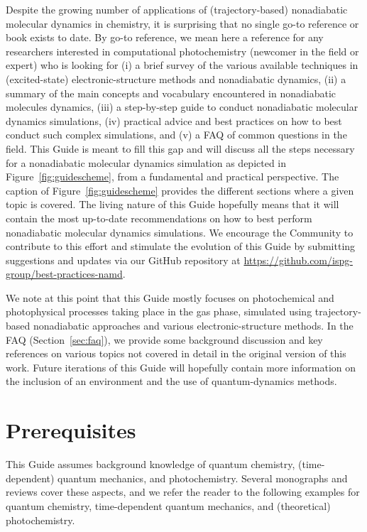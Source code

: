 \documentclass[9pt,bestpractices,pubversion]{livecoms}
\newcommand{\githubrepository}{\url{https://github.com/ispg-group/best-practices-namd}}  %
\begin{document}
Despite the growing number of applications of (trajectory-based) nonadiabatic molecular dynamics in chemistry, it is surprising that no single go-to reference or book exists to date. By go-to reference, we mean here a reference for any researchers interested in computational photochemistry (newcomer in the field or expert) who is looking for (i) a brief survey of the various available techniques in (excited-state) electronic-structure methods and nonadiabatic dynamics, (ii) a summary of the main concepts and vocabulary encountered in nonadiabatic molecules dynamics, (iii) a step-by-step guide to conduct nonadiabatic molecular dynamics simulations, (iv) practical advice and best practices on how to best conduct such complex simulations, and (v) a FAQ of common questions in the field. This Guide is meant to fill this gap and will discuss all the steps necessary for a nonadiabatic molecular dynamics simulation as depicted in Figure~\ref{fig:guidescheme}, from a fundamental and practical perspective. The caption of Figure~\ref{fig:guidescheme} provides the different sections where a given topic is covered. The living nature of this Guide hopefully means that it will contain the most up-to-date recommendations on how to best perform nonadiabatic molecular dynamics simulations. We encourage the Community to contribute to this effort and stimulate the evolution of this Guide by submitting suggestions and updates via our GitHub repository at \githubrepository.

We note at this point that this Guide mostly focuses on photochemical and photophysical processes taking place in the gas phase, simulated using trajectory-based nonadiabatic approaches and various electronic-structure methods. In the FAQ (Section~\ref{sec:faq}), we provide some background discussion and key references on various topics not covered in detail in the original version of this work. Future iterations of this Guide will hopefully contain more information on the inclusion of an environment and the use of quantum-dynamics methods. 


\section{Prerequisites}

This Guide assumes background knowledge of quantum chemistry, (time-dependent) quantum mechanics, and photochemistry. Several monographs and reviews cover these aspects, and we refer the reader to the following examples for quantum chemistry,\cite{mcquarrie2008quantum,atkins2011molecular,szabo1989modern,tddftcarsten} time-dependent quantum mechanics,\cite{schatz2002quantum,tannor_book} and (theoretical) photochemistry.\cite{turro2009principles,michl,persico2018photochemistry} 
\end{document}

